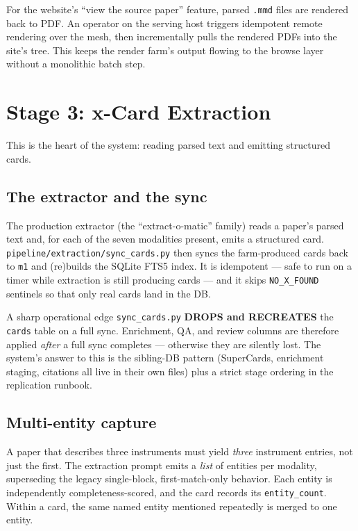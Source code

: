 \documentclass[11pt,letterpaper]{article}
\newcommand{\code}[1]{\texttt{\small #1}}
\begin{document}
For the website's ``view the source paper'' feature, parsed \code{.mmd} files are
rendered back to PDF. An operator on the serving host triggers idempotent remote
rendering over the mesh, then incrementally pulls the rendered PDFs into the site's
tree. This keeps the render farm's output flowing to the browse layer without a
monolithic batch step.

\clearpage
\section{Stage 3: x-Card Extraction}

This is the heart of the system: reading parsed text and emitting structured cards.

\subsection{The extractor and the sync}

The production extractor (the ``extract-o-matic'' family) reads a paper's parsed
text and, for each of the seven modalities present, emits a structured card.
\code{pipeline/extraction/sync\_cards.py} then syncs the farm-produced cards back to
\code{m1} and (re)builds the SQLite FTS5 index. It is idempotent --- safe to run on a
timer while extraction is still producing cards --- and it skips \code{NO\_X\_FOUND}
sentinels so that only real cards land in the DB.

\begin{rulebox}{A sharp operational edge}
\code{sync\_cards.py} \textbf{DROPS and RECREATES} the \code{cards} table on a full
sync. Enrichment, QA, and review columns are therefore applied \emph{after} a full
sync completes --- otherwise they are silently lost. The system's answer to this is
the sibling-DB pattern (SuperCards, enrichment staging, citations all live in their
own files) plus a strict stage ordering in the replication runbook.
\end{rulebox}

\subsection{Multi-entity capture}

A paper that describes three instruments must yield \emph{three} instrument entries,
not just the first. The extraction prompt emits a \emph{list} of entities per
modality, superseding the legacy single-block, first-match-only behavior. Each
entity is independently completeness-scored, and the card records its
\code{entity\_count}. Within a card, the same named entity mentioned repeatedly is
merged to one entity.
\end{document}
